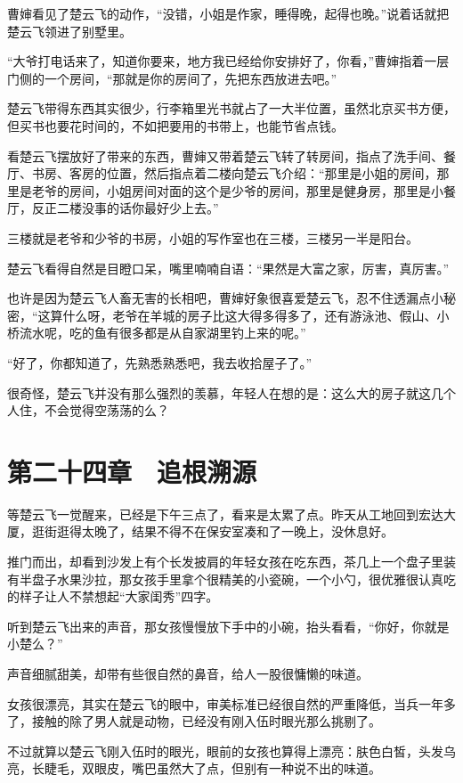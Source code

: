 曹婶看见了楚云飞的动作，“没错，小姐是作家，睡得晚，起得也晚。”说着话就把楚云飞领进了别墅里。

“大爷打电话来了，知道你要来，地方我已经给你安排好了，你看，”曹婶指着一层门侧的一个房间，“那就是你的房间了，先把东西放进去吧。”

楚云飞带得东西其实很少，行李箱里光书就占了一大半位置，虽然北京买书方便，但买书也要花时间的，不如把要用的书带上，也能节省点钱。

看楚云飞摆放好了带来的东西，曹婶又带着楚云飞转了转房间，指点了洗手间、餐厅、书房、客房的位置，然后指点着二楼向楚云飞介绍：“那里是小姐的房间，那里是老爷的房间，小姐房间对面的这个是少爷的房间，那里是健身房，那里是小餐厅，反正二楼没事的话你最好少上去。”

三楼就是老爷和少爷的书房，小姐的写作室也在三楼，三楼另一半是阳台。

楚云飞看得自然是目瞪口呆，嘴里喃喃自语：“果然是大富之家，厉害，真厉害。”

也许是因为楚云飞人畜无害的长相吧，曹婶好象很喜爱楚云飞，忍不住透漏点小秘密，“这算什么呀，老爷在羊城的房子比这大得多得多了，还有游泳池、假山、小桥流水呢，吃的鱼有很多都是从自家湖里钓上来的呢。”

“好了，你都知道了，先熟悉熟悉吧，我去收拾屋子了。”

很奇怪，楚云飞并没有那么强烈的羡慕，年轻人在想的是：这么大的房子就这几个人住，不会觉得空荡荡的么？

\section{第二十四章　追根溯源}

等楚云飞一觉醒来，已经是下午三点了，看来是太累了点。昨天从工地回到宏达大厦，逛街逛得太晚了，结果不得不在保安室凑和了一晚上，没休息好。

推门而出，却看到沙发上有个长发披肩的年轻女孩在吃东西，茶几上一个盘子里装有半盘子水果沙拉，那女孩手里拿个很精美的小瓷碗，一个小勺，很优雅很认真吃的样子让人不禁想起“大家闺秀”四字。

听到楚云飞出来的声音，那女孩慢慢放下手中的小碗，抬头看看，“你好，你就是小楚么？”

声音细腻甜美，却带有些很自然的鼻音，给人一股很慵懒的味道。

女孩很漂亮，其实在楚云飞的眼中，审美标准已经很自然的严重降低，当兵一年多了，接触的除了男人就是动物，已经没有刚入伍时眼光那么挑剔了。

不过就算以楚云飞刚入伍时的眼光，眼前的女孩也算得上漂亮：肤色白皙，头发乌亮，长睫毛，双眼皮，嘴巴虽然大了点，但别有一种说不出的味道。

